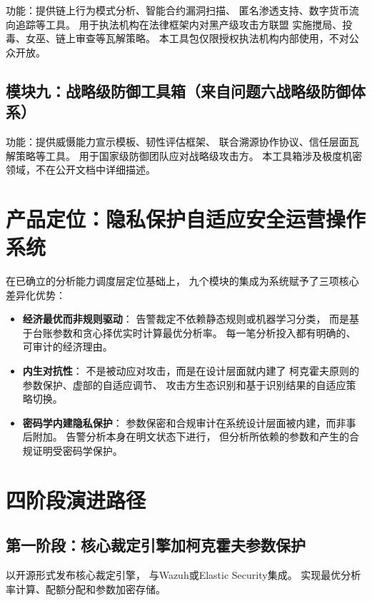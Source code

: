 \documentclass[11pt,a4paper]{article}
\begin{document}
功能：提供链上行为模式分析、智能合约漏洞扫描、
匿名渗透支持、数字货币流向追踪等工具。
用于执法机构在法律框架内对黑产级攻击方联盟
实施搅局、投毒、女巫、链上审查等瓦解策略。
本工具包仅限授权执法机构内部使用，不对公众开放。

\subsection{模块九：战略级防御工具箱（来自问题六战略级防御体系）}

功能：提供威慑能力宣示模板、韧性评估框架、
联合溯源协作协议、信任层面瓦解策略等工具。
用于国家级防御团队应对战略级攻击方。
本工具箱涉及极度机密领域，不在公开文档中详细描述。

\section{产品定位：隐私保护自适应安全运营操作系统}

在已确立的分析能力调度层定位基础上，
九个模块的集成为系统赋予了三项核心差异化优势：

\begin{itemize}
    \item \textbf{经济最优而非规则驱动}：
          告警裁定不依赖静态规则或机器学习分类，
          而是基于台账参数和贪心择优实时计算最优分析率。
          每一笔分析投入都有明确的、可审计的经济理由。
    \item \textbf{内生对抗性}：
          不是被动应对攻击，而是在设计层面就内建了
          柯克霍夫原则的参数保护、虚部的自适应调节、
          攻击方生态识别和基于识别结果的自适应策略切换。
    \item \textbf{密码学内建隐私保护}：
          参数保密和合规审计在系统设计层面被内建，而非事后附加。
          告警分析本身在明文状态下进行，
          但分析所依赖的参数和产生的合规证明受密码学保护。
\end{itemize}

\section{四阶段演进路径}

\subsection{第一阶段：核心裁定引擎加柯克霍夫参数保护}

以开源形式发布核心裁定引擎，
与Wazuh或Elastic Security集成。
实现最优分析率计算、配额分配和参数加密存储。
\end{document}
